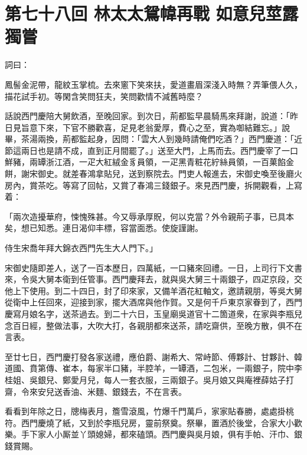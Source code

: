 
\chapter*{第七十八回 林太太鴛幃再戰 如意兒莖露獨嘗}


詞曰：

\begin{myquote}
鳳髻金泥帶，龍紋玉掌梳。去來窻下笑來扶，愛道畫眉深淺入時無？弄筆偎人久，描花試手初。等閑含笑問狂夫，笑問歡情不減舊時麼？
\end{myquote}

話說西門慶陪大舅飲酒，至晚回家。到次日，荊都監早晨騎馬來拜謝，說道：「昨日見旨意下來，下官不勝歡喜，足見老翁愛厚，費心之至，實為啣結難忘。」說畢，茶湯兩換，荊都監起身，因問：「雲大人到幾時請俺們吃酒？」西門慶道：「近節這兩日也是請不成，直到正月間罷了。」送至大門，上馬而去。西門慶宰了一口鮮豬，兩罈浙江酒，一疋大紅絨金豸員領，一疋黑青粧花紵絲員領，一百菓餡金餅，謝宋御史。就差春鴻拿貼兒，送到察院去。門吏人報進去，宋御史喚至後廳火房內，賞茶吃。等寫了回帖，又賞了春鴻三錢銀子。來見西門慶，拆開觀看，上寫着：

\begin{myquote}[\markfont]
「兩次造擾華府，悚愧殊甚。今又辱承厚貺，何以克當？外令親荊子事，已具本矣，想已知悉。連日渴仰丰標，容當面悉。使旋謹謝。

侍生宋喬年拜大錦衣西門先生大人門下。」
\end{myquote}

宋御史隨即差人，送了一百本歷日，四萬紙，一口豬來回禮。一日，上司行下文書來，令吳大舅本衛到任管事。西門慶拜去，就與吳大舅三十兩銀子，四疋京段，交他上下使用。到二十四日，封了印來家，又備羊酒花紅軸文，邀請親朋，等吳大舅從衛中上任回來，迎接到家，擺大酒席與他作賀。又是何千戶東京家眷到了，西門慶寫月娘名字，送茶過去。到二十六日，玉皇廟吳道官十二箇道衆，在家與李瓶兒念百日經，整做法事，大吹大打，各親朋都來送茶，請吃齋供，至晚方散，俱不在言表。

至廿七日，西門慶打發各家送禮，應伯爵、謝希大、常峙節、傅夥計、甘夥計、韓道國、賁第傳、崔本，每家半口豬，半腔羊，一罈酒，二包米，一兩銀子，院中李桂姐、吳銀兒、鄭愛月兒，每人一套衣服，三兩銀子。{}吳月娘又與庵裡薛姑子打齋，令來安兒送香油、米麵、銀錢去，不在言表。

看看到年除之日，牕梅表月，簷雪滾風，{}竹爆千門萬戶，家家貼春勝，處處掛桃符。西門慶燒了紙，又到於李瓶兒房，靈前祭奠。祭畢，置酒於後堂，合家大小歡樂。手下家人小厮並丫頭媳婦，都來磕頭。西門慶與吳月娘，俱有手帕、汗巾、銀錢賞賜。

